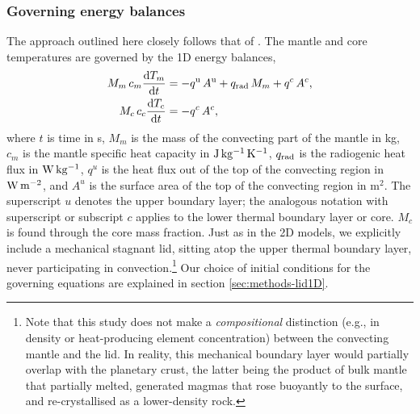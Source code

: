 \subsubsection{Governing energy balances}

The approach outlined here closely follows that of \citet{thiriet_scaling_2019}. The mantle and core temperatures are governed by the 1D energy balances,
\begin{align}\label{eq:T_ODE}
\begin{split}
M_m \, c_{m} \frac{{\rm d}T_m}{{\rm d}t} &= -q^{\rm u} \, A^{\rm u} + q_{\rm rad} \, M_m + q^c \, A^c, \\
M_c \, c_{c} \frac{{\rm d}T_c}{{\rm d}t} &= -q^c \, A^c,
\end{split}
\end{align}
where $t$ is time in s, $M_m$ is the mass of the convecting part of the mantle in kg, $c_{m}$ is the mantle specific heat capacity in ${\rm J\,kg^{-1}\,K^{-1}}$, $q_{\rm rad}$ is the radiogenic heat flux in ${\rm W\,kg^{-1}}$, $q^{u}$ is the heat flux out of the top of the convecting region in ${\rm W\,m^{-2}}$, and $A^{u}$ is the surface area of the top of the convecting region in m$^{2}$. The superscript $u$ denotes the upper boundary layer; the analogous notation with superscript or subscript $c$ applies to the lower thermal boundary layer or core. $M_c$ is found through the core mass fraction. Just as in the 2D models, we explicitly include a mechanical stagnant lid, sitting atop the upper thermal boundary layer, never participating in convection.\footnote{Note that this study does not make a \emph{compositional} distinction (e.g., in density or heat-producing element concentration) between the convecting mantle and the lid. In reality, this mechanical boundary layer would partially overlap with the planetary crust, the latter being the product of bulk mantle that partially melted, generated magmas that rose buoyantly to the surface, and re-crystallised as a lower-density rock.} Our choice of initial conditions for the governing equations are explained in section \ref{sec:methods-lid1D}.

